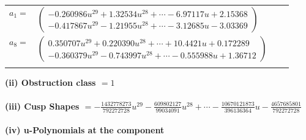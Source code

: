 \documentclass[1p]{elsarticle_modified}
\theoremstyle{definition}
\begin{document}
\begin{tabular}{m{7pt} m{180pt} m{7pt} m{180pt} }
\flushright $a_{1}=$&$\begin{pmatrix}-0.260986 u^{29}+1.32534 u^{28}+\cdots-6.97117 u+2.15368\\-0.417867 u^{29}-1.21955 u^{28}+\cdots-3.12685 u-3.03369\end{pmatrix}$ \\
\flushright $a_{8}=$&$\begin{pmatrix}0.350707 u^{29}+0.220390 u^{28}+\cdots+10.4421 u+0.172289\\-0.360379 u^{29}-0.743997 u^{28}+\cdots-0.555988 u+1.36712\end{pmatrix}$\\&\end{tabular}
\flushleft \textbf{(ii) Obstruction class $= 1$}\\~\\
\flushleft \textbf{(iii) Cusp Shapes $= -\frac{1432778273}{792272728} u^{29}-\frac{609802127}{99034091} u^{28}+\cdots-\frac{10670121873}{396136364} u-\frac{4657685801}{792272728}$}\\~\\
\newpage\renewcommand{\arraystretch}{1}
\flushleft \textbf{(iv) u-Polynomials at the component}\newline \\
\end{document}
